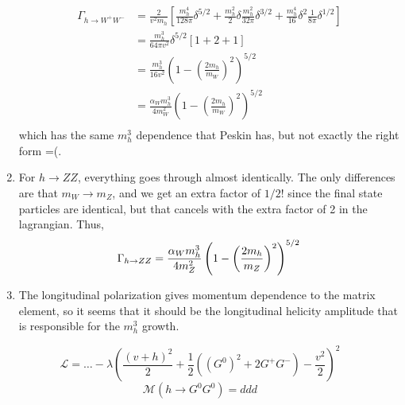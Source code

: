 \documentclass[12pt]{article}
\begin{document}
\begin{enumerate}[label=(\alph*)]
    \begin{align*}
        \Gamma_{h\to W^+W^-} &= \frac{2}{v^2m_h} \left[\frac{m_h^4}{128\pi}\delta^{5/2} + \frac{m_h^2}{2}\delta\frac{m_h^2}{32\pi}\delta^{3/2} + \frac{m_h^4}{16}\delta^2\frac{1}{8\pi}\delta^{1/2}\right] \\
        &= \frac{m_h^3}{64\pi v^2}\delta^{5/2}[1 + 2 + 1] \\
        &= \frac{m_h^3}{16v^2}\left(1 - \left(\frac{2m_h}{m_W}\right)^2\right)^{5/2} \\
        &= \frac{\alpha_Wm_h^3}{4m_W^2}\left(1 - \left(\frac{2m_h}{m_W}\right)^2\right)^{5/2} \\
    \end{align*}
    which has the same $m_h^3$ dependence that Peskin has, but not exactly the right form =(.

    \item For $h \to ZZ$, everything goes through almost identically. The only differences are that $m_W \to m_Z$, and we get an extra factor of $1/2!$ since the final state particles are identical, but that cancels with the extra factor of 2 in the lagrangian. Thus,
    \[ \Gamma_{h \to ZZ} = \frac{\alpha_Wm_h^3}{4m_Z^2}\left(1 - \left(\frac{2m_h}{m_Z}\right)^2\right)^{5/2} \\ \]
    \item The longitudinal polarization gives momentum dependence to the matrix element, so it seems that it should be the longitudinal helicity amplitude that is responsible for the $m_h^3$ growth.
\end{enumerate}

\[ \mathscr{L} = \dots -\lambda\left(\frac{(v + h)^2}{2} + \frac{1}{2}\left(\left(G^0\right)^2 + 2G^+G^-\right) - \frac{v^2}{2}\right)^2 \]
\[ \mathcal{M}(h\to G^0G^0) = ddd \]
\end{document}
